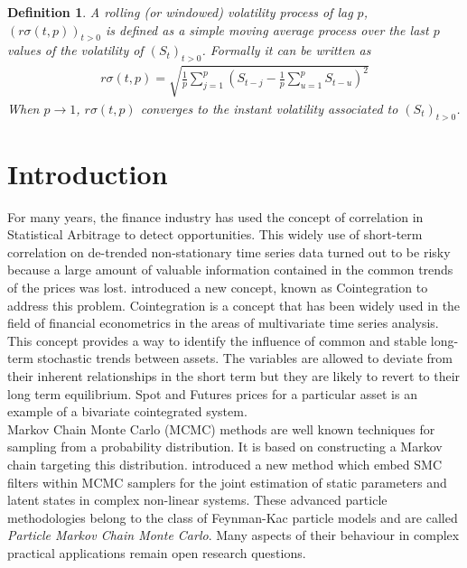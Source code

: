 \documentclass[11pt,a4,twosided,singlespacing,titlepagenumber=on]{scrreprt}
\numberwithin{equation}{chapter} %
\newtheorem{definition}[theorem]{Definition}%
\theoremstyle{remark}
\begin{document}
\begin{definition}
A rolling (or windowed) volatility process of lag $p$, $(r\sigma(t,p))_{t>0}$ is defined as a simple moving average process over the last $p$ values of the volatility of $(S_t)_{t>0}$. Formally it can be written as
\begin{align*}
r\sigma(t,p) = \sqrt{\frac{1}{p} \sum_{j=1}^p \left(S_{t-j} - \frac{1}{p}\sum_{u=1}^p S_{t-u} \right)^2}
\end{align*}
When $p \rightarrow 1$, $r\sigma(t,p)$ converges to the instant volatility associated to $(S_t)_{t>0}$. \label{windowed_volatility}
\end{definition}

\chapter{Introduction}

For many years, the finance industry has used the concept of correlation in Statistical Arbitrage to detect opportunities. This widely use of short-term correlation on de-trended non-stationary time series data turned out to be risky because a large amount of valuable information contained in the common trends of the prices was lost. \cite{engle1987} introduced a new concept, known as Cointegration to address this problem. Cointegration is a concept that has been widely used in the field of financial econometrics in the areas of multivariate time series analysis. This concept provides a way to identify the influence of common and stable long-term stochastic trends between assets. The variables are allowed to deviate from their inherent relationships in the short term but they are likely to revert to their long term equilibrium. Spot and Futures prices for a particular asset is an example of a bivariate cointegrated system. \\


Markov Chain Monte Carlo (MCMC) methods are well known techniques for sampling from a probability distribution. It is based on constructing a Markov chain targeting this distribution. \cite{andrieu2010} introduced a new method which embed SMC filters within MCMC samplers for the joint estimation of static parameters and latent states in complex non-linear systems. These advanced particle methodologies belong to the class of Feynman-Kac particle models and are called \textit{Particle Markov Chain Monte Carlo}. Many aspects of their behaviour in complex practical applications remain open research questions. \\
\end{document}
